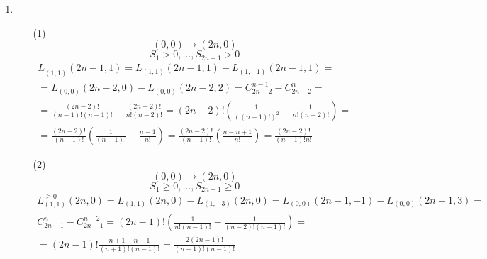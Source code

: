 \documentclass[12pt,letterpaper]{article}
\begin{document}
\begin{enumerate}[label=(\alph*)]

    \item \begin{itemize}
        
        \item [(1)] \[ (0, 0) \rightarrow (2n, 0) \]
            \[ S_1 > 0, \dots, S_{2n-1} > 0 \]
            \begin{gather*}
                L_{(1, 1)}^{+} (2n -1, 1) = L_{(1, 1)}(2n-1,1) - L_{(1,-1)}(2n-1,1) = \\
                = L_{(0, 0)}(2n-2, 0) - L_{(0, 0)}(2n-2,2) =
                C_{2n-2}^{n-1} - C_{2n-2}^{n} = \\
                = \frac{(2n-2)!}{(n-1)! (n-1)!} - \frac{(2n-2)!}{n! (n-2)!} =
                (2n-2)! \left( \frac{1}{((n-1)!)^2} - \frac{1}{n!(n-2)!}  \right) = \\
                = \frac{(2n-2)!}{(n-1)!} \left( \frac{1}{(n-1)!} - \frac{n-1}{n!} \right) =
                \frac{(2n-2)!}{(n-1)!} \left( \frac{n-n+1}{n!} \right) =
                \frac{(2n-2)!}{(n-1)!n!}
            \end{gather*}

        \item [(2)] \[ (0, 0) \rightarrow (2n, 0) \]
            \[ S_1 \geq 0, \dots, S_{2n-1} \geq 0 \]
            \begin{gather*}
                L_{(1,1)}^{\geq 0} (2n, 0) = L_{(1,1)}(2n,0) - L_{(1, -3)} (2n, 0) =
                L_{(0,0)} (2n-1, -1) - L_{(0, 0)} (2n-1,3) = \\
                C_{2n-1}^{n} - C_{2n-1}^{n-2} =
                (2n-1)! \left( \frac{1}{n! (n-1)!} - \frac{1}{(n-2)!(n+1)!}\right) = \\
                = (2n-1)! \frac{n+1-n+1}{(n+1)! (n-1)!} = \frac{2(2n-1)!}{(n+1)! (n-1)!}
            \end{gather*}

    \end{itemize}


\end{enumerate}
\end{document}
